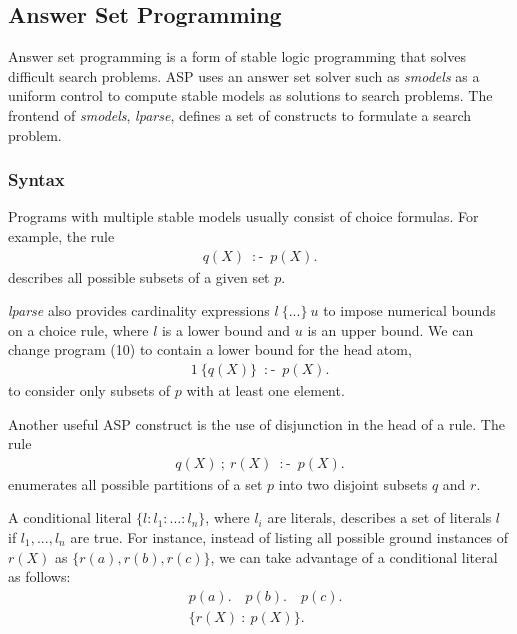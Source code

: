 \subsection{Answer Set Programming}
Answer set programming is a form of stable logic programming that solves difficult 
search problems. ASP uses an answer set solver such as \textit{smodels} as a uniform control 
to compute stable models as solutions to search problems. The frontend of \textit{smodels}, 
\textit{lparse}, defines a set of constructs to formulate a search problem. 

\subsubsection{Syntax}
Programs 
with multiple stable models usually consist of choice formulas. For example, the rule 
\begin{align}
    {q(X)} \: \mathop{:\!\!-} \: p(X).
\end{align}
describes all possible subsets of a given set $p$. 

\textit{lparse} also provides cardinality expressions $l \: \{...\} \: u$ to impose numerical 
bounds on a choice rule, where $l$ is a lower bound and $u$ is an upper bound. We can change 
program (10) to contain a lower bound for the head atom, 
\begin{align*}
    1 \: \{q(X)\} \: \mathop{:\!\!-} \: p(X).
\end{align*}
to consider only subsets of $p$ with at least one element. 

Another useful ASP construct is the use of disjunction in the head of a rule. The 
rule 
\begin{align*}
    q(X) \: ; \: r(X) \: \mathop{:\!\!-} \: p(X).
\end{align*}
enumerates all possible partitions of a set $p$ into two disjoint subsets $q$ and $r$. 

A conditional literal $\{l:l_1:...:l_n\}$, where $l_i$ are literals, describes a set of 
literals $l$ if $l_1,...,l_n$ are true. For instance, instead of listing all possible 
ground instances of $r(X)$ as $\{r(a),r(b),r(c)\}$, we can take advantage of a conditional 
literal as follows:
\begin{align*}
    &p(a). \hspace{1em} p(b). \hspace{1em} p(c). \\
    &\{r(X) \: : \: p(X)\}.
\end{align*}

